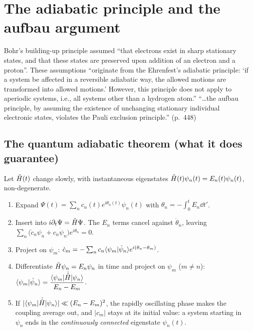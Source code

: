\section{The adiabatic principle and the aufbau argument}\label{sec:adiabatic}

\begin{reviewclaim}
Bohr's building-up principle assumed ``that electrons exist in sharp stationary states, and that these
states are preserved upon addition of an electron and a proton''. These assumptions ``originate from the
Ehrenfest's adiabatic principle: `if a system be affected in a reversible adiabatic way, the allowed
motions are transformed into allowed motions.' However, this principle does not apply to aperiodic
systems, i.e., all systems other than a hydrogen atom.'' ``\dots the aufbau principle, by assuming the
existence of unchanging stationary individual electronic states, violates the Pauli exclusion principle.''
(p.~448)
\end{reviewclaim}

\subsection{The quantum adiabatic theorem (what it does guarantee)}
Let $\hat H(t)$ change slowly, with instantaneous eigenstates $\hat H(t)\psi_n(t)=E_n(t)\psi_n(t)$, non-degenerate.
\begin{enumerate}
  \item Expand $\Psi(t)=\sum_nc_n(t)e^{i\theta_n(t)}\psi_n(t)$ with $\theta_n=-\int_0^tE_n\dd t'$.
  \item Insert into $i\partial_t\Psi=\hat H\Psi$. The $E_n$ terms cancel against $\dot\theta_n$, leaving
        $\sum_n\bigl(\dot c_n\psi_n+c_n\dot\psi_n\bigr)e^{i\theta_n}=0$.
  \item Project on $\psi_m$: $\dot c_m=-\sum_nc_n\langle \psi_m\vert \dot\psi_n\rangle e^{i(\theta_n-\theta_m)}$.
  \item Differentiate $\hat H\psi_n=E_n\psi_n$ in time and project on $\psi_m$ ($m\ne n$):
        $\langle \psi_m\vert \dot\psi_n\rangle=\dfrac{\langle \psi_m\vert \dot{\hat H}\vert \psi_n\rangle}{E_n-E_m}$.
  \item If $|\langle \psi_m\vert \dot{\hat H}\vert \psi_n\rangle|\ll(E_n-E_m)^2$, the rapidly oscillating phase makes the coupling average
        out, and $|c_m|$ stays at its initial value: a system starting in $\psi_n$ ends in the
        \emph{continuously connected} eigenstate $\psi_n(t)$.
\end{enumerate}

